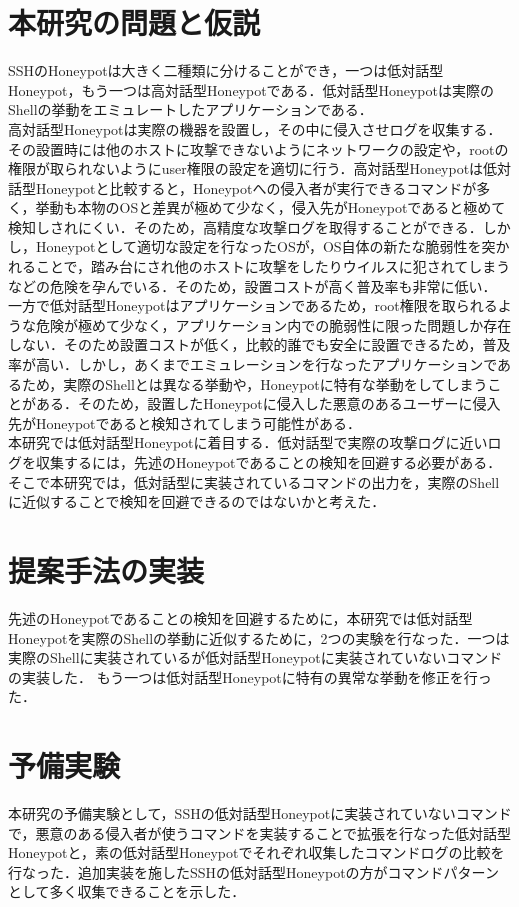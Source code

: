 \section{本研究の問題と仮説}
\label{intr:prob}
SSHのHoneypotは大きく二種類に分けることができ，一つは低対話型Honeypot，もう一つは高対話型Honeypotである．低対話型Honeypotは実際のShellの挙動をエミュレートしたアプリケーションである．\\
高対話型Honeypotは実際の機器を設置し，その中に侵入させログを収集する．その設置時には他のホストに攻撃できないようにネットワークの設定や，rootの権限が取られないようにuser権限の設定を適切に行う．高対話型Honeypotは低対話型Honeypotと比較すると，Honeypotへの侵入者が実行できるコマンドが多く，挙動も本物のOSと差異が極めて少なく，侵入先がHoneypotであると極めて検知しされにくい．そのため，高精度な攻撃ログを取得することができる．しかし，Honeypotとして適切な設定を行なったOSが，OS自体の新たな脆弱性を突かれることで，踏み台にされ他のホストに攻撃をしたりウイルスに犯されてしまうなどの危険を孕んでいる．そのため，設置コストが高く普及率も非常に低い．\cite{highinthoney}\\一方で低対話型Honeypotはアプリケーションであるため，root権限を取られるような危険が極めて少なく，アプリケーション内での脆弱性に限った問題しか存在しない．そのため設置コストが低く，比較的誰でも安全に設置できるため，普及率が高い．しかし，あくまでエミュレーションを行なったアプリケーションであるため，実際のShellとは異なる挙動や，Honeypotに特有な挙動をしてしまうことがある．そのため，設置したHoneypotに侵入した悪意のあるユーザーに侵入先がHoneypotであると検知されてしまう可能性がある．\\
本研究では低対話型Honeypotに着目する．低対話型で実際の攻撃ログに近いログを収集するには，先述のHoneypotであることの検知を回避する必要がある．そこで本研究では，低対話型に実装されているコマンドの出力を，実際のShellに近似することで検知を回避できるのではないかと考えた．

\section{提案手法の実装}
\label{intr:impl}
先述のHoneypotであることの検知を回避するために，本研究では低対話型Honeypotを実際のShellの挙動に近似するために，2つの実験を行なった．一つは実際のShellに実装されているが低対話型Honeypotに実装されていないコマンドの実装した．
もう一つは低対話型Honeypotに特有の異常な挙動を修正を行った．

\section{予備実験}
\label{intr:prex}
本研究の予備実験として，SSHの低対話型Honeypotに実装されていないコマンドで，悪意のある侵入者が使うコマンドを実装することで拡張を行なった低対話型Honeypotと，素の低対話型Honeypotでそれぞれ収集したコマンドログの比較を行なった．追加実装を施したSSHの低対話型Honeypotの方がコマンドパターンとして多く収集できることを示した．

